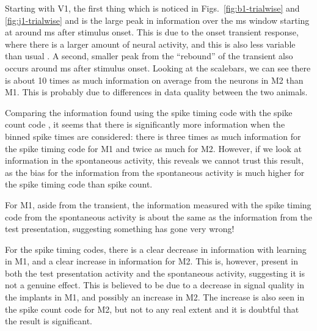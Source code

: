 
Starting with V1, the first thing which is noticed in Figs.~\ref{fig:b1-trialwise} and \ref{fig:j1-trialwise}  and  is the large peak in information over the \unit[20]{ms} window starting at around \unit[40]{ms} after stimulus onset. This is due to the onset transient response, where there is a larger amount of neural activity, and this is also less variable than usual \cite{Muller2001}. A second, smaller peak from the ``rebound'' of the transient also occurs around \unit[100]{ms} after stimulus onset. Looking at the scalebars, we can see there is about 10 times as much information on average from the neurons in M2 than M1. This is probably due to differences in data quality between the two animals.

Comparing the information found using the spike timing code  with the spike count code , it seems that there is significantly more information when the binned spike times are considered: there is three times as much information for the spike timing code for M1 and twice as much for M2. However, if we look at information in the spontaneous activity, this reveals we cannot trust this result, as the bias for the information from the spontaneous activity is much higher for the spike timing code than spike count.

For M1, aside from the transient, the information measured with the spike timing code from the spontaneous activity is about the same as the information from the test presentation, suggesting something has gone very wrong!

For the spike timing codes, there is a clear decrease in information with learning in M1, and a clear increase in information for M2. This is, however, present in both the test presentation activity and the spontaneous activity, suggesting it is not a genuine effect. This is believed to be due to a decrease in signal quality in the implants in M1, and possibly an increase in M2.
The increase is also seen in the spike count code for M2, but not to any real extent and it is doubtful that the result is significant.

